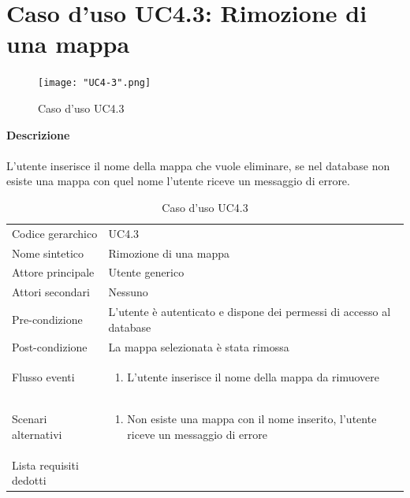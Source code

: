 \documentclass[a4paper]{report}
\begin{document}
	 \section{Caso d'uso UC4.3: Rimozione di una mappa}
	 \begin{figure}[H]
			\centering
			\texttt{[image: "UC4-3".png]}
			\caption{Caso d'uso UC4.3}
		\end{figure}
	 \textbf{Descrizione} \\ \\
	 L'utente inserisce il nome della mappa che vuole eliminare, se nel database non esiste una mappa con
	 quel nome l'utente riceve un messaggio di errore.
		\begin{table}[H]
		\begin{tabularx}{\textwidth}{X | X}\toprule
			\rowcolor{orange!65}Codice gerarchico & UC4.3\\
			Nome sintetico & Rimozione di una mappa\\
			\rowcolor{orange!65}Attore principale & Utente generico\\
			Attori secondari & Nessuno \\
			\rowcolor{orange!65}Pre-condizione & L'utente è autenticato e dispone dei permessi di accesso
			al database\\
			Post-condizione & La mappa selezionata è stata rimossa\\
			\rowcolor{orange!65}Flusso eventi & \begin{enumerate}
			\item L'utente inserisce il nome della mappa da rimuovere
			\end{enumerate} \\
			Scenari alternativi & \begin{enumerate}
			\item Non esiste una mappa con il nome inserito, l'utente riceve un messaggio di errore
			\end{enumerate} \\
			\rowcolor{orange!65}Lista requisiti dedotti & \\
			\bottomrule
		\end{tabularx}
		\caption{Caso d'uso UC4.3}
	 \end{table}
\end{document}
